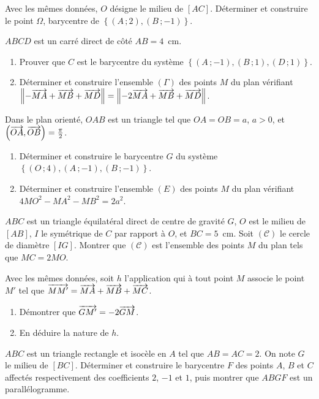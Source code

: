 \begin{annales}
Avec les mêmes données, $O$ désigne le milieu de $[AC]$. Déterminer et
construire le point $\Omega$, barycentre de
$\left\{(A\,;2),(B\,;-1)\right\}$.

$ABCD$ est un carré direct de côté $AB = 4$~cm.
\begin{enumerate}[label=\textbf{\alph*)}, leftmargin=*, itemsep=0.15em]
  \item Prouver que $C$ est le barycentre du système
        $\left\{(A\,;-1),(B\,;1),(D\,;1)\right\}$.
  \item Déterminer et construire l'ensemble $(\Gamma)$ des points $M$ du plan
        vérifiant
        $\left\lVert -\overrightarrow{MA}+\overrightarrow{MB}+\overrightarrow{MD} \right\rVert
        = \left\lVert -2\overrightarrow{MA}+\overrightarrow{MB}+\overrightarrow{MD} \right\rVert$.
\end{enumerate}

Dans le plan orienté, $OAB$ est un triangle tel que $OA = OB = a$, $a>0$, et
$\left(\overrightarrow{OA},\overrightarrow{OB}\right) = \frac{\pi}{2}$.
\begin{enumerate}[label=\textbf{\alph*)}, leftmargin=*, itemsep=0.15em]
  \item Déterminer et construire le barycentre $G$ du système
        $\left\{(O\,;4),(A\,;-1),(B\,;-1)\right\}$.
  \item Déterminer et construire l'ensemble $(E)$ des points $M$ du plan
        vérifiant $4MO^{2}-MA^{2}-MB^{2} = 2a^{2}$.
\end{enumerate}

$ABC$ est un triangle équilatéral direct de centre de gravité $G$, $O$ est le
milieu de $[AB]$, $I$ le symétrique de $C$ par rapport à $O$, et $BC = 5$~cm.
Soit $(\mathcal C)$ le cercle de diamètre $[IG]$. Montrer que
$(\mathcal C)$ est l'ensemble des points $M$ du plan tels que
$MC = 2MO$.

Avec les mêmes données, soit $h$ l'application qui à tout point $M$ associe le
point $M'$ tel que
$\overrightarrow{MM'} = \overrightarrow{MA}+\overrightarrow{MB}+\overrightarrow{MC}$.
\begin{enumerate}[label=\textbf{\alph*)}, leftmargin=*, itemsep=0.15em]
  \item Démontrer que $\overrightarrow{GM'} = -2\overrightarrow{GM}$.
  \item En déduire la nature de $h$.
\end{enumerate}

$ABC$ est un triangle rectangle et isocèle en $A$ tel que $AB = AC = 2$. On
note $G$ le milieu de $[BC]$. Déterminer et construire le barycentre $F$ des
points $A$, $B$ et $C$ affectés respectivement des coefficients $2$, $-1$ et
$1$, puis montrer que $ABGF$ est un parallélogramme.
\end{annales}

